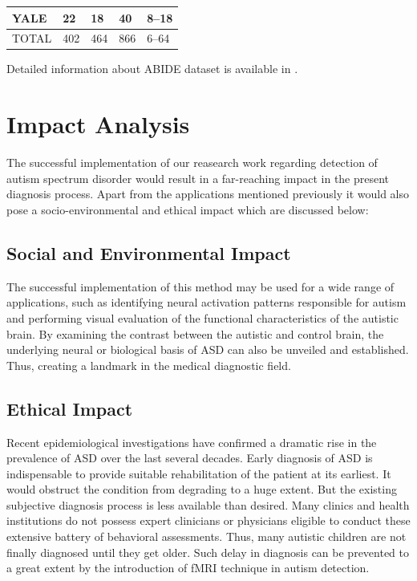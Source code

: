 \begin{table}[h!]
\begin{center}
\begin{tabular}{|l|l|l|l|l|}
YALE                                                 & 22                                & 18                                    & 40                                  & 8–18                                                     \\ \hline
TOTAL                                                & 402                               & 464                                   & 866                                 & 6–64                                                     \\ \hline

\end{tabular}
\end{center}
\end{table}

Detailed information about ABIDE dataset is available in \cite{abide}.

\section{Impact Analysis}
The successful implementation of our reasearch work regarding detection of autism spectrum disorder would result in a far-reaching impact in the present diagnosis process. Apart from the applications mentioned previously it would also pose a socio-environmental and ethical impact which are discussed below:

\subsection{Social and Environmental Impact}
The successful implementation of this method may be used for a wide range of applications, such as identifying neural activation patterns responsible for autism and performing visual evaluation of the functional characteristics of the autistic brain. By examining the contrast between the autistic and control brain, the underlying neural or biological basis of ASD can also be unveiled and established. Thus, creating a landmark in the medical diagnostic field.

\subsection{Ethical Impact}
Recent epidemiological investigations have confirmed a dramatic rise in the prevalence of
ASD over the last several decades. Early diagnosis of ASD is indispensable to provide
suitable rehabilitation of the patient at its earliest. It would obstruct the condition from
degrading to a huge extent. But the existing subjective diagnosis process is less available than desired. Many clinics and health institutions do not possess expert clinicians or physicians eligible to conduct these extensive battery of behavioral assessments. Thus, many autistic children are not finally diagnosed until they get older. Such delay in diagnosis can be prevented to a great extent by the introduction of fMRI technique in autism detection. 

